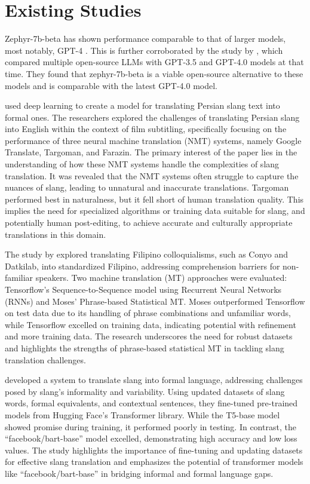 \section{Existing Studies}
Zephyr-7b-beta has shown performance comparable to that of larger models, most notably, GPT-4 \cite{tunstall2023zephyr}. This is further corroborated by the study by , which compared multiple open-source LLMs with GPT-3.5 and GPT-4.0 models at that time. They found that zephyr-7b-beta is a viable open-source alternative to these models and is comparable with the latest GPT-4.0 model.

 used deep learning to create a model for translating Persian slang text into formal ones. The researchers explored the challenges of translating Persian slang into English within the context of film subtitling, specifically focusing on the performance of three neural machine translation (NMT) systems, namely Google Translate, Targoman, and Farazin. The primary interest of the paper lies in the understanding of how these NMT systems handle the complexities of slang translation. It was revealed that the NMT systems often struggle to capture the nuances of slang, leading to unnatural and inaccurate translations. Targoman performed best in naturalness, but it fell short of human translation quality. This implies the need for specialized algorithms or training data suitable for slang, and potentially human post-editing, to achieve accurate and culturally appropriate translations in this domain.

The study by  explored translating Filipino colloquialisms, such as Conyo and Datkilab, into standardized Filipino, addressing comprehension barriers for non-familiar speakers. Two machine translation (MT) approaches were evaluated: Tensorflow's Sequence-to-Sequence model using Recurrent Neural Networks (RNNs) and Moses' Phrase-based Statistical MT. Moses outperformed Tensorflow on test data due to its handling of phrase combinations and unfamiliar words, while Tensorflow excelled on training data, indicating potential with refinement and more training data. The research underscores the need for robust datasets and highlights the strengths of phrase-based statistical MT in tackling slang translation challenges.

 developed a system to translate slang into formal language, addressing challenges posed by slang's informality and variability. Using updated datasets of slang words, formal equivalents, and contextual sentences, they fine-tuned pre-trained models from Hugging Face's Transformer library. While the T5-base model showed promise during training, it performed poorly in testing. In contrast, the “facebook/bart-base” model excelled, demonstrating high accuracy and low loss values. The study highlights the importance of fine-tuning and updating datasets for effective slang translation and emphasizes the potential of transformer models like “facebook/bart-base” in bridging informal and formal language gaps. 

